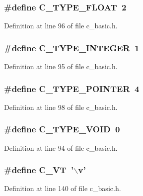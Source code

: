\subsubsection{\setlength{\rightskip}{0pt plus 5cm}\#define C\_\-TYPE\_\-FLOAT~2}\label{c__basic_8h_c77c9a8ea3ee95b0812353143c7e5237}




Definition at line 96 of file c\_\-basic.h.
\subsubsection{\setlength{\rightskip}{0pt plus 5cm}\#define C\_\-TYPE\_\-INTEGER~1}\label{c__basic_8h_5c6f8f8faff3ae4ebdb3777789a588db}




Definition at line 95 of file c\_\-basic.h.
\subsubsection{\setlength{\rightskip}{0pt plus 5cm}\#define C\_\-TYPE\_\-POINTER~4}\label{c__basic_8h_c757e70baf07487cb44b92341b56ede6}




Definition at line 98 of file c\_\-basic.h.
\subsubsection{\setlength{\rightskip}{0pt plus 5cm}\#define C\_\-TYPE\_\-VOID~0}\label{c__basic_8h_d1ae2059ce453a100d4052f06eeadbf8}




Definition at line 94 of file c\_\-basic.h.
\subsubsection{\setlength{\rightskip}{0pt plus 5cm}\#define C\_\-VT~'$\backslash$v'}\label{c__basic_8h_74f5478d41b793937d585d35a40191d5}




Definition at line 140 of file c\_\-basic.h.

